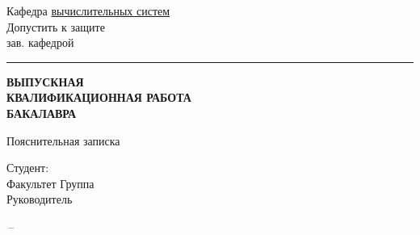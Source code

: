 \begin{titlepage}
    
    \vspace{0.3cm}

    \begin{flushright}
        \begin{minipage}{8cm}
            Кафедра \underline{вычислительных систем} \\
            Допустить к защите \\
            зав. кафедрой \chiefpos \\
            \rule{3cm}{1pt} \chief
        \end{minipage}
    \end{flushright}

    \vfill
    \begin{center}
        \LARGE
        \textbf{ВЫПУСКНАЯ \\ КВАЛИФИКАЦИОННАЯ РАБОТА \\ БАКАЛАВРА}
        \normalsize
    \end{center}
    \begin{center}
        \Large
        \topicname
    \end{center}

    \begin{center}
        \large
        Пояснительная записка
    \end{center}
    \begin{minipage}{0.95\textwidth}
        Студент: \fio \\

        Факультет \underline{\faculty} Группа \underline{\group} \\

        Руководитель \underline{\thead} \\
    \end{minipage}
    \vfill
    \vfill
    \vfill
    \begin{center}
        \town\,--\,\year
    \end{center}
\end{titlepage}

\setcounter{page}{2}
\thispagestyle{empty}
\newpage
